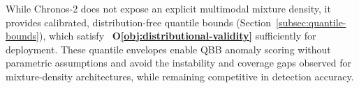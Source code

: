 While Chronos-2 does not expose an explicit multimodal mixture density, it provides
calibrated, distribution-free quantile bounds (Section~\ref{subsec:quantile-bounds}),
which satisfy ~\textbf{O\ref{obj:distributional-validity}} sufficiently for
deployment. These quantile envelopes enable \ac{QBB} anomaly scoring without
parametric assumptions and avoid the instability and coverage gaps observed for
mixture-density architectures, while remaining competitive in detection accuracy.


